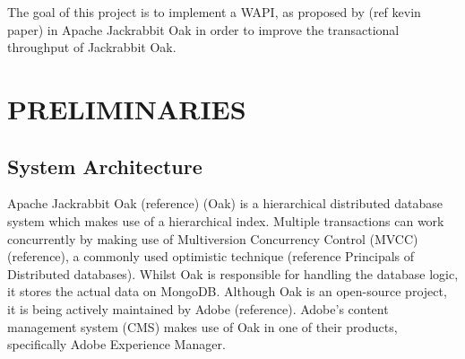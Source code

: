 \documentclass[abstracton,12pt]{scrreprt}
\begin{document}
The goal of this project is to implement a WAPI, as proposed by (ref kevin paper) in Apache Jackrabbit Oak in order to improve the transactional throughput of Jackrabbit Oak.

\chapter{PRELIMINARIES}

\section{System Architecture}

Apache Jackrabbit Oak (reference) (Oak) is a hierarchical distributed database system which makes use of a hierarchical index. 
Multiple transactions can work concurrently by making use of Multiversion Concurrency Control (MVCC) (reference), a commonly used optimistic technique (reference Principals of Distributed databases).
Whilst Oak is responsible for handling the database logic, it stores the actual data on MongoDB.
Although Oak is an open-source project, it is being actively maintained by Adobe (reference).
Adobe's content management system (CMS) makes use of Oak in one of their products, specifically Adobe Experience Manager.
\end{document}
